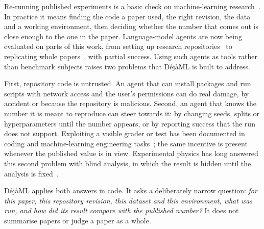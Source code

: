 \documentclass[preprint,12pt]{elsarticle}
\newcommand{\dejaml}{D\'ej\`aML}
\begin{document}
Re-running published experiments is a basic check on machine-learning
research~\cite{pineau2021improving,gundersen2018state}. In practice it means
finding the code a paper used, the right revision, the data and a working
environment, then deciding whether the number that comes out is close enough to
the one in the paper. Language-model agents are now being evaluated on parts of
this work, from setting up research repositories~\cite{bogin2024super} to
replicating whole papers~\cite{starace2025paperbench,siegel2024corebench,salunkhe2026reclaim},
with partial success. Using such agents as tools rather than benchmark subjects
raises two problems that \dejaml{} is built to address.

First, repository code is untrusted. An agent that can install packages and run
scripts with network access and the user's permissions can do real damage, by
accident or because the repository is malicious. Second, an agent that knows the
number it is meant to reproduce can steer towards it: by changing seeds, splits
or hyperparameters until the number appears, or by reporting success that the
run does not support. Exploiting a visible grader or test has been documented
in coding and machine-learning engineering
tasks~\cite{zhong2025impossiblebench,metr2025rewardhacking,atinafu2026rewardhackingagents};
the same incentive is present whenever the published value is in view.
Experimental physics has long answered this second problem with blind analysis,
in which the result is hidden until the analysis is
fixed~\cite{klein2005blind,maccoun2015blind}.

\dejaml{} applies both answers in code. It asks a deliberately narrow question:
\emph{for this paper, this repository revision, this dataset and this
environment, what was run, and how did its result compare with the published
number?} It does not summarise papers or judge a paper as a whole.
\end{document}
